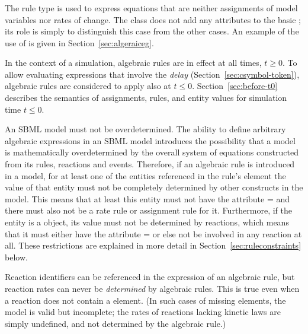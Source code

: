 \subsubsection{}
\label{sec:algebraicrule}

The rule type \AlgebraicRule is used to express equations that are
neither assignments of model variables nor rates of change.  The
\AlgebraicRule class does not add any attributes to the basic
\Rule; its role is simply to distinguish this case from the other
cases.  An example of the use of \AlgebraicRule is given in
Section~\ref{sec:algeraiceg}.

In the context of a simulation, algebraic rules are in effect at
all times, $t \geq 0$.  To allow evaluating expressions that
involve the \emph{delay} 
(Section~\ref{sec:csymbol-token}), algebraic rules are considered
to apply also at $t \leq 0$.  Section~\ref{sec:before-t0}
describes the semantics of assignments, rules, and entity values
for simulation time $t \leq 0$.

An SBML model must not be overdetermined.  The ability to define
arbitrary algebraic expressions in an SBML model introduces the
possibility that a model is mathematically overdetermined by the
overall system of equations constructed from its rules, reactions
and events.  Therefore, if an algebraic rule is introduced in a
model, for at least one of the entities referenced in the rule's
 element the value of that entity must not be
completely determined by other constructs in the model.  This
means that at least this entity must not have the attribute
= and there must also not be a rate rule
or assignment rule for it.  Furthermore, if the entity is a
\Species object, its value must not be determined by reactions,
which means that it must either have the attribute
= or else not be involved in
any reaction at all.  These restrictions are explained in more
detail in Section~\ref{sec:ruleconstraints} below.

Reaction identifiers can be referenced in the  
expression of an algebraic rule, but reaction rates can never be
\emph{determined} by algebraic rules.  This is true even when a
reaction does not contain a \KineticLaw element.  (In such cases
of missing \KineticLaw elements, the model is valid but 
incomplete; the rates of reactions lacking kinetic laws are
simply undefined, and not determined by the algebraic rule.)


\subsubsection{}
\label{sec:assignmentrule}


